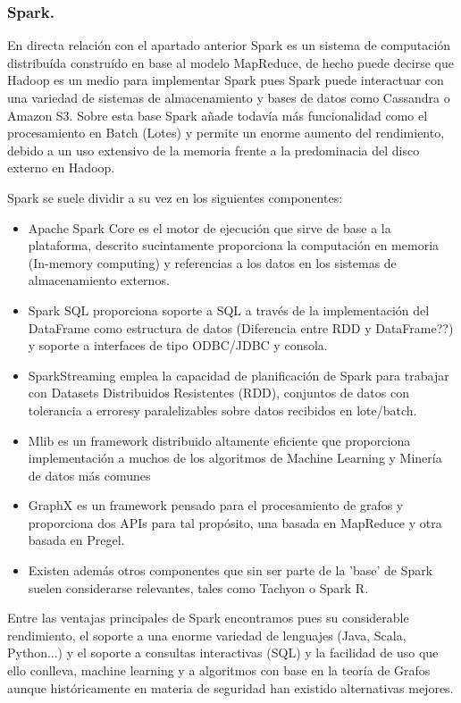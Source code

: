 \documentclass[11pt, a4paper]{article} %
\begin{document}
\subsubsection{Spark.}
En directa relación con el apartado anterior Spark es un sistema de computación distribuída construído en base al modelo MapReduce, de hecho puede decirse que Hadoop es un medio para implementar Spark pues Spark puede interactuar con una variedad de sistemas de almacenamiento y bases de datos como Cassandra o Amazon S3. Sobre esta base Spark añade todavía más funcionalidad como el procesamiento en Batch (Lotes) y permite un enorme aumento del rendimiento, debido a un uso extensivo de la memoria frente a la predominacia del disco externo en Hadoop. \cite{docspark2} \cite{docspark1}


Spark se suele dividir a su vez en los siguientes componentes: \cite{docspark2}
\begin{itemize}
\item Apache Spark Core es el motor de ejecución que sirve de base a la plataforma, descrito sucintamente proporciona la computación en memoria (In-memory computing) y referencias a los datos en los sistemas de almacenamiento externos.
\item Spark SQL proporciona soporte a SQL a través de la implementación del DataFrame como estructura de datos (Diferencia entre RDD y DataFrame??) y soporte a interfaces de tipo ODBC/JDBC y consola.
\item SparkStreaming emplea la capacidad de planificación de Spark para trabajar con Datasets Distribuidos Resistentes (RDD), conjuntos de datos con tolerancia a erroresy paralelizables sobre datos recibidos en lote/batch.
\item Mlib es un framework distribuido altamente eficiente que proporciona implementación a muchos de los algoritmos de Machine Learning y Minería de datos más comunes
\item GraphX es un framework pensado para el procesamiento de grafos y proporciona dos APIs para tal propósito, una basada en MapReduce y otra basada en Pregel.
\item Existen además otros componentes que sin ser parte de la 'base' de Spark suelen considerarse relevantes, tales como Tachyon o Spark R.
\end{itemize}


Entre las ventajas principales de Spark encontramos pues su considerable rendimiento, el soporte a una enorme variedad de lenguajes (Java, Scala, Python...) y el soporte a consultas interactivas (SQL) y la facilidad de uso que ello conlleva, machine learning y a algoritmos con base en la teoría de Grafos aunque históricamente en materia de seguridad han existido alternativas mejores. \cite{docspark1}
\end{document}
